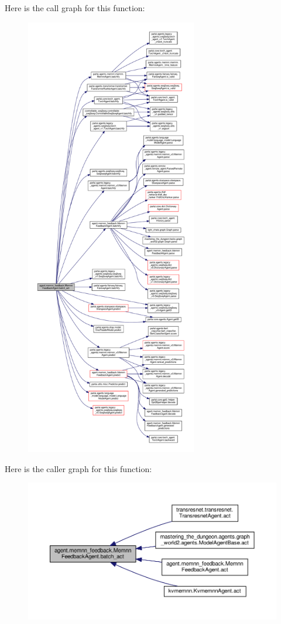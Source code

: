 Here is the call graph for this function\+:
\nopagebreak
\begin{figure}[H]
\begin{center}
\leavevmode
\includegraphics[height=550pt]{classagent_1_1memnn__feedback_1_1MemnnFeedbackAgent_a0988c186c27ab70d318ea30e39a0a5cc_cgraph}
\end{center}
\end{figure}
Here is the caller graph for this function\+:
\nopagebreak
\begin{figure}[H]
\begin{center}
\leavevmode
\includegraphics[width=350pt]{classagent_1_1memnn__feedback_1_1MemnnFeedbackAgent_a0988c186c27ab70d318ea30e39a0a5cc_icgraph}
\end{center}
\end{figure}
